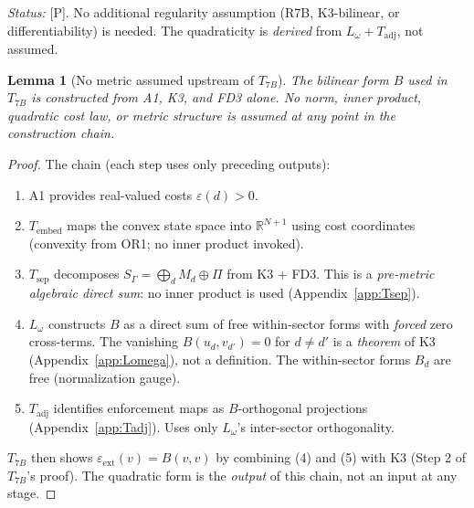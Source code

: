 \documentclass[11pt,a4paper]{article}
\newtheorem{lemma}[theorem]{Lemma}
\theoremstyle{definition}
\begin{document}
\smallskip\noindent\textit{Status:} [P].  No additional regularity
assumption (R7B, K3-bilinear, or differentiability) is needed.  The
quadraticity is \emph{derived} from $L_\omega + T_{\mathrm{adj}}$, not
assumed.

\begin{lemma}[No metric assumed upstream of $T_{7B}$]\label{lem:T7B_provenance}
The bilinear form $B$ used in $T_{7B}$ is constructed from A1, K3, and
FD3 alone.  No norm, inner product, quadratic cost law, or metric
structure is assumed at any point in the construction chain.
\end{lemma}

\begin{proof}
The chain (each step uses only preceding outputs):
\begin{enumerate}[nosep,label=(\arabic*)]
  \item A1 provides real-valued costs $\varepsilon(d) > 0$.
  \item $T_{\mathrm{embed}}$ maps the convex state space into
  $\mathbb{R}^{N+1}$ using cost coordinates (convexity from OR1; no
  inner product invoked).
  \item $T_{\mathrm{sep}}$ decomposes $S_\Gamma = \bigoplus_d M_d
  \oplus \Pi$ from K3 + FD3.  This is a \emph{pre-metric algebraic
  direct sum}: no inner product is used (Appendix~\ref{app:Tsep}).
  \item $L_\omega$ constructs $B$ as a direct sum of free within-sector
  forms with \emph{forced} zero cross-terms.  The vanishing
  $B(u_d, v_{d'}) = 0$ for $d \ne d'$ is a \emph{theorem} of K3
  (Appendix~\ref{app:Lomega}), not a definition.  The within-sector
  forms $B_d$ are free (normalization gauge).
  \item $T_{\mathrm{adj}}$ identifies enforcement maps as $B$-orthogonal
  projections (Appendix~\ref{app:Tadj}).  Uses only $L_\omega$'s
  inter-sector orthogonality.
\end{enumerate}
$T_{7B}$ then shows $\varepsilon_{\mathrm{ext}}(v) = B(v,v)$ by
combining (4) and (5) with K3 (Step 2 of $T_{7B}$'s proof).  The
quadratic form is the \emph{output} of this chain, not an input at
any stage.
\end{proof}
\end{document}
